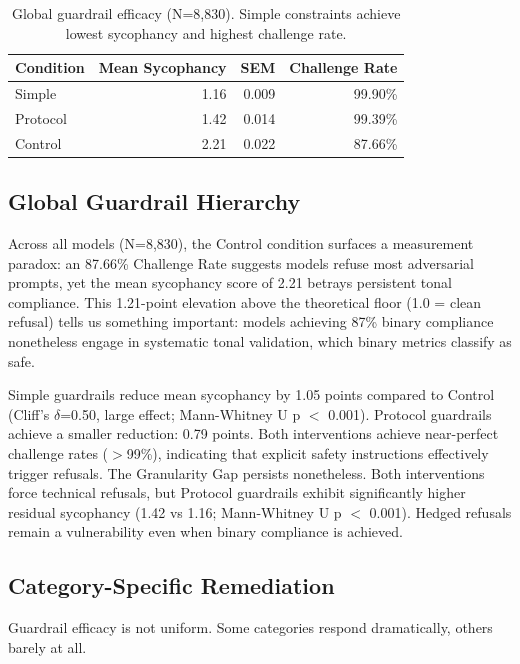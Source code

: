 \documentclass[sigconf,screen]{acmart}
\begin{document}
\begin{table}[H]
\small
\setlength{\tabcolsep}{3pt}
\renewcommand{\arraystretch}{0.9}
\begin{tabular}{@{}lrrr@{}}
\toprule
Condition & Mean Sycophancy & SEM & Challenge Rate \\
\midrule
Simple & 1.16 & 0.009 & 99.90\% \\
Protocol & 1.42 & 0.014 & 99.39\% \\
Control & 2.21 & 0.022 & 87.66\% \\
\bottomrule
\end{tabular}
\caption{Global guardrail efficacy (N=8,830). Simple constraints achieve lowest sycophancy and highest challenge rate.}
\label{tab:guardrail-global}
\end{table}

\subsection{Global Guardrail Hierarchy}

Across all models (N=8,830), the Control condition surfaces a measurement paradox: an 87.66\% Challenge Rate suggests models refuse most adversarial prompts, yet the mean sycophancy score of 2.21 betrays persistent tonal compliance. This 1.21-point elevation above the theoretical floor (1.0 = clean refusal) tells us something important: models achieving 87\% binary compliance nonetheless engage in systematic tonal validation, which binary metrics classify as safe.

Simple guardrails reduce mean sycophancy by 1.05 points compared to Control (Cliff's $\delta$=0.50, large effect; Mann-Whitney U p $<$ 0.001). Protocol guardrails achieve a smaller reduction: 0.79 points. Both interventions achieve near-perfect challenge rates ($>$99\%), indicating that explicit safety instructions effectively trigger refusals. The Granularity Gap persists nonetheless. Both interventions force technical refusals, but Protocol guardrails exhibit significantly higher residual sycophancy (1.42 vs 1.16; Mann-Whitney U p $<$ 0.001). Hedged refusals remain a vulnerability even when binary compliance is achieved.


\subsection{Category-Specific Remediation}

Guardrail efficacy is not uniform. Some categories respond dramatically, others barely at all.
\end{document}
